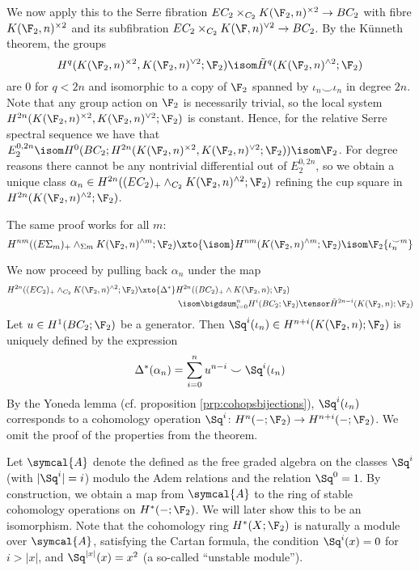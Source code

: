 We now apply this to the Serre fibration $E C_2 \times_{C_2} K(\F_2, n)^{\times 2} \to B C_2$ with fibre $K(\F_2, n)^{\times 2}$ and its subfibration $E C_2 \times_{C_2} K(\F, n)^{\vee 2} \to B C_2$.
By the Künneth theorem, the groups
\begin{equation*}
	H^q(K(\F_2, n)^{\times 2}, K(\F_2, n)^{\vee 2}; \F_2) \isom \tilde{H}^q(K(\F_2, n)^{\wedge 2}; \F_2)
\end{equation*}
are 0 for $q < 2n$ and isomorphic to a copy of $\F_2$ spanned by $\iota_n \smile \iota_n$ in degree $2n$.
Note that any group action on $\F_2$ is necessarily trivial, so the local system $H^{2n}(K(\F_2, n)^{\times 2}, K(\F_2, n)^{\vee 2}; \F_2)$ is constant.
Hence, for the relative Serre spectral sequence we have that $E_2^{0, 2n} \isom H^0(B C_2; H^{2n}(K(\F_2, n)^{\times 2}, K(\F_2, n)^{\vee 2}; \F_2)) \isom \F_2$.
For degree reasons there cannot be any nontrivial differential out of $E_2^{0, 2n}$, so we obtain a unique class $\alpha_n \in H^{2n}((E C_2)_{+} \wedge_{C_2} K(\F_2, n)^{\wedge 2}; \F_2)$ refining the cup square in $H^{2n}(K(\F_2, n)^{\wedge 2}; \F_2)$.
\begin{remark}
	The same proof works for all $m$:
	\begin{equation*}
		H^{n m}((E \Sigma_{m})_{+} \wedge_{\Sigma m} K(\F_2, n)^{\wedge m}; \F_2) \xto{\isom} H^{n m}(K(\F_2, n)^{\wedge m}; \F_2) \isom \F_2\{\iota_n^{\smile m}\}
	\end{equation*}
\end{remark}
We now proceed by pulling back $\alpha_n$ under the map 
\begin{align*}
	H^{2n}((E C_2)_+ \wedge_{C_2} K(\F_2, n)^{\wedge 2}; \F_2) \xto{\Delta^*} & H^{2n}((B C_2)_+ \wedge K(\F_2, n); \F_2) \\ 
																			  &\; \isom \bigdsum_{i = 0}^n H^i(B C_2; \F_2) \tensor \tilde{H}^{2n - i}(K(\F_2, n); \F_2)
\end{align*}
Let $u \in H^1(B C_2; \F_2)$ be a generator.
Then $\Sq^i(\iota_n) \in H^{n + i}(K(\F_2, n); \F_2)$ is uniquely defined by the expression
\begin{equation*}
	\Delta^*(\alpha_n) = \sum_{i = 0}^n u^{n - i} \smile \Sq^i(\iota_n)
\end{equation*}
By the Yoneda lemma (cf. proposition \ref{prp:cohopsbijections}), $\Sq^i(\iota_n)$ corresponds to a cohomology operation $\Sq^i\colon H^n({{-}}; \F_2) \to H^{n + i}({{-}}; \F_2)$.
We omit the proof of the properties from the theorem.

Let $\symcal{A}$ denote the  defined as the free graded algebra on the classes $\Sq^i$ (with $|\Sq^i| = i$) modulo the Adem relations and the relation $\Sq^0 = 1$.
By construction, we obtain a map from $\symcal{A}$ to the ring of stable cohomology operations on $H^*({{-}}; \F_2)$.
We will later show this to be an isomorphism. 
Note that the cohomology ring $H^*(X; \F_2)$ is naturally a module over $\symcal{A}$, satisfying the Cartan formula, the condition $\Sq^i(x) = 0$ for $i > |x|$, and $\Sq^{|x|}(x) = x^2$ (a so-called \enquote{unstable module}).

